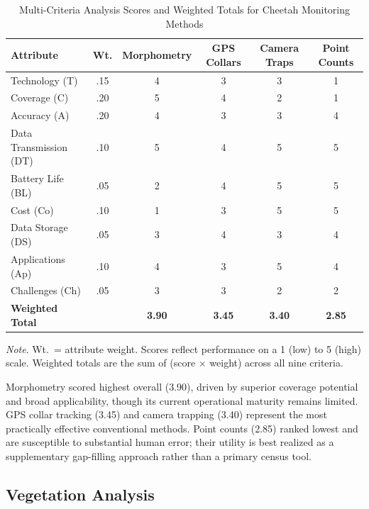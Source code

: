 \documentclass[12pt, letterpaper]{article}
\begin{document}
\begin{table}[H]
\caption{Multi-Criteria Analysis Scores and Weighted Totals for Cheetah Monitoring Methods}
\label{tab:mcda}
\centering
\renewcommand{\arraystretch}{1.35}
\begin{tabular}{l c c c c c}
\toprule
\textbf{Attribute} & \textbf{Wt.} & \textbf{Morphometry} & \textbf{GPS Collars} & \textbf{Camera Traps} & \textbf{Point Counts} \\
\midrule
Technology (T)          & .15 & 4 & 3 & 3 & 1 \\
Coverage (C)            & .20 & 5 & 4 & 2 & 1 \\
Accuracy (A)            & .20 & 4 & 3 & 3 & 4 \\
Data Transmission (DT)  & .10 & 5 & 4 & 5 & 5 \\
Battery Life (BL)       & .05 & 2 & 4 & 5 & 5 \\
Cost (Co)               & .10 & 1 & 3 & 5 & 5 \\
Data Storage (DS)       & .05 & 3 & 4 & 3 & 4 \\
Applications (Ap)       & .10 & 4 & 3 & 5 & 4 \\
Challenges (Ch)         & .05 & 3 & 3 & 2 & 2 \\
\midrule
\textbf{Weighted Total} &     & \textbf{3.90} & \textbf{3.45} & \textbf{3.40} & \textbf{2.85} \\
\bottomrule
\end{tabular}
\vspace{4pt}
\noindent\footnotesize\textit{Note}. Wt.\ = attribute weight. Scores reflect performance on a
1 (low) to 5 (high) scale. Weighted totals are the sum of (score $\times$ weight) across all nine
criteria.
\end{table}

\vspace{4pt}

Morphometry scored highest overall (3.90), driven by superior coverage potential and broad
applicability, though its current operational maturity remains limited. GPS collar tracking
(3.45) and camera trapping (3.40) represent the most practically effective conventional
methods. Point counts (2.85) ranked lowest and are susceptible to substantial human error;
their utility is best realized as a supplementary gap-filling approach rather than a primary census
tool.

\subsection{Vegetation Analysis}
\end{document}
